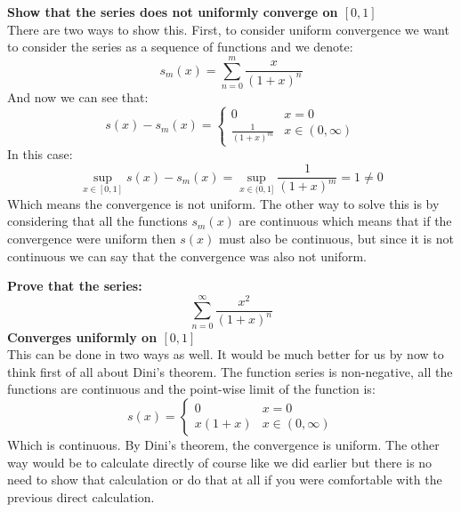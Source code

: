 \documentclass{article}
\theoremstyle{plain}
\begin{document}
	\newpage
	
	\textbf{Show that the series does not uniformly converge on $[0,1]$} \\
	There are two ways to show this. First, to consider uniform convergence
	we want to consider the series as a sequence of functions and we denote:
	\[
		s_m(x) = \sum_{n=0}^{m}{\frac{x}{(1+x)^n}}
	\]
	And now we can see that:
	\[
		s(x) - s_m(x) = \begin{cases}
			0 &x=0 \\
			\frac{1}{(1+x)^m} &x\in(0,\infty)
		\end{cases}
	\]
	In this case:
	\[
		\sup_{x\in[0,1]}{s(x) - s_m(x)} = 
		\sup_{x\in(0,1]}{\frac{1}{(1+x)^m}} = 1 \neq 0
	\]
	Which means the convergence is not uniform. The other way to solve
	this is by considering that all the functions $s_m(x)$ are continuous
	which means that if the convergence were uniform then $s(x)$ must
	also be continuous, but since it is not continuous we can say that
	the convergence was also not uniform.
	
	\newpage
	
	\textbf{Prove that the series:
	\[
		\sum_{n=0}^{\infty}{\frac{x^2}{(1+x)^n}}
	\]
	Converges uniformly on $[0,1]$} \\
	This can be done in two ways as well. It would be much better for us
	by now to think first of all about Dini's theorem. The function
	series is non-negative, all the functions are continuous and the
	point-wise limit of the function is:
	\[
		s(x) = \begin{cases}
			0 &x=0 \\
			x(1+x) &x\in(0,\infty)
		\end{cases}
	\]
	Which is continuous. By Dini's theorem, the convergence is uniform.
	The other way would be to calculate directly of course like we did
	earlier but there is no need to show that calculation or do that
	at all if you were comfortable with the previous direct calculation.
	
	\newpage
	
\end{document}
